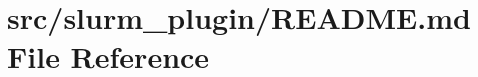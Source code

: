 \hypertarget{src_2slurm__plugin_2README_8md}{}\section{src/slurm\+\_\+plugin/\+R\+E\+A\+D\+ME.md File Reference}
\label{src_2slurm__plugin_2README_8md}
